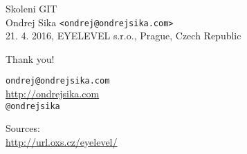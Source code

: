 \documentclass{beamer}
\begin{document}
\begin{frame}

    {\LARGE Skoleni GIT}\\
    \vspace{7mm}
    {\Large Ondrej Sika \lstinline|<ondrej@ondrejsika.com>|}\\
    \vspace{7mm}
    \vspace{7mm}
    21. 4. 2016, EYELEVEL s.r.o., Prague, Czech Republic\\

\end{frame}





\begin{frame}

    {\LARGE Thank you!}\\

    \vspace{1cm}

    \texttt{ondrej@ondrejsika.com}\\
    \url{http://ondrejsika.com}\\
    \texttt{@ondrejsika}\\

    \vspace{1cm}

    Sources:\\
    \url{http://url.oxs.cz/eyelevel/}
\end{frame}
\end{document}
